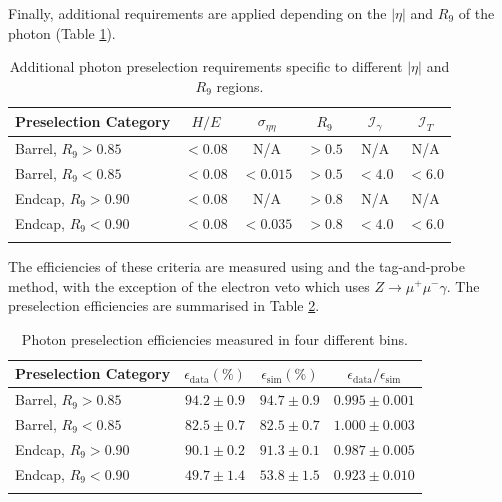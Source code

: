 Finally, additional requirements are applied depending on the $|\eta|$ and $R_9$ of the photon (Table \ref{tab:object_reco:presel_cuts}).
\begin{table}[h!]
    \centering
    \renewcommand{\arraystretch}{1.3}
    \begin{tabular}{ l | c c c c c}
        \thickhline
        Preselection Category & $H/E$ & $\sigma_{\eta\eta}$ & $R_9$ & $\mathcal{I}_{\gamma}$ & $\mathcal{I}_T$ \\
        \hline
        Barrel, $R_{9}>0.85$ & $<0.08$  & N/A      & $>0.5$  & N/A    & N/A    \\ 
        Barrel, $R_{9}<0.85$ & $<0.08$  & $<0.015$ & $>0.5$  & $<4.0$ & $<6.0$ \\
        \hline
        Endcap, $R_{9}>0.90$ & $<0.08$  & N/A      & $>0.8$  & N/A    & N/A    \\
        Endcap, $R_{9}<0.90$ & $<0.08$  & $<0.035$ & $>0.8$  & $<4.0$ & $<6.0$ \\
        \thickhline
\end{tabular}
    \caption{Additional photon preselection requirements specific to different $|\eta|$ and $R_9$ regions.}
    \label{tab:object_reco:presel_cuts}
\end{table}



The efficiencies of these criteria are measured using \Zee and the tag-and-probe method, 
with the exception of the electron veto which uses $Z\rightarrow{}\mu^{+}\mu^{-}\gamma$. The preselection efficiencies are summarised in Table \ref{tab:object_reco:presel_eff}.
\begin{table}[h!]
    \centering
    \renewcommand{\arraystretch}{1.3}
    \begin{tabular}{ l | c c c }
        \thickhline
        Preselection Category& $\epsilon_{\mathrm{data}} (\%)$ & $\epsilon_{\mathrm{sim}} (\%)$ & $\epsilon_{\mathrm{data}}/\epsilon_{\mathrm{sim}}$ \\
        \hline
        Barrel, $R_{9}>0.85$ & $94.2\pm0.9$ & $94.7\pm0.9$ & $0.995\pm0.001$ \\
        Barrel, $R_{9}<0.85$ & $82.5\pm0.7$ & $82.5\pm0.7$ & $1.000\pm0.003$ \\ 
        \hline
        Endcap, $R_{9}>0.90$ & $90.1\pm0.2$ & $91.3\pm0.1$ & $0.987\pm0.005$ \\ 
        Endcap, $R_{9}<0.90$ & $49.7\pm1.4$ & $53.8\pm1.5$ & $0.923\pm0.010$ \\ 
        \thickhline
\end{tabular}
    \caption{Photon preselection efficiencies measured in four different bins.}
    \label{tab:object_reco:presel_eff}
\end{table}





